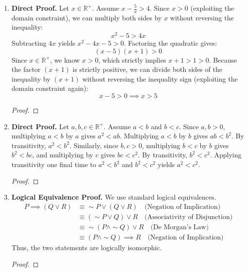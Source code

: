 \documentclass[11pt]{article}
\renewcommand{\qedsymbol}{$\blacksquare$}
\begin{document}
\begin{enumerate}
    \item \textbf{Direct Proof.} Let $x \in \mathbb{R}^+$. Assume $x - \frac{5}{x} > 4$. Since $x > 0$ (exploiting the domain constraint), we can multiply both sides by $x$ without reversing the inequality:
    \[ x^2 - 5 > 4x \]
    Subtracting $4x$ yields $x^2 - 4x - 5 > 0$. Factoring the quadratic gives:
    \[ (x - 5)(x + 1) > 0 \]
    Since $x \in \mathbb{R}^+$, we know $x > 0$, which strictly implies $x + 1 > 1 > 0$. Because the factor $(x + 1)$ is strictly positive, we can divide both sides of the inequality by $(x + 1)$ without reversing the inequality sign (exploiting the domain constraint again):
    \[ x - 5 > 0 \implies x > 5 \]
    \begin{proof}\renewcommand{\qedsymbol}{$\blacksquare$}\end{proof}

    \item \textbf{Direct Proof.} Let $a, b, c \in \mathbb{R}^+$. Assume $a < b$ and $b < c$. Since $a, b > 0$, multiplying $a < b$ by $a$ gives $a^2 < ab$. Multiplying $a < b$ by $b$ gives $ab < b^2$. By transitivity, $a^2 < b^2$. Similarly, since $b, c > 0$, multiplying $b < c$ by $b$ gives $b^2 < bc$, and multiplying by $c$ gives $bc < c^2$. By transitivity, $b^2 < c^2$. Applying transitivity one final time to $a^2 < b^2$ and $b^2 < c^2$ yields $a^2 < c^2$.
    \begin{proof}\renewcommand{\qedsymbol}{$\blacksquare$}\end{proof}

    \item \textbf{Logical Equivalence Proof.} We use standard logical equivalences.
    \begin{align*}
        P \implies (Q \lor R) &\equiv \sim P \lor (Q \lor R) \quad \text{(Negation of Implication)} \\
                              &\equiv (\sim P \lor Q) \lor R \quad \text{(Associativity of Disjunction)} \\
                              &\equiv \sim(P \land \sim Q) \lor R \quad \text{(De Morgan's Law)} \\
                              &\equiv (P \land \sim Q) \implies R \quad \text{(Negation of Implication)}
    \end{align*}
    Thus, the two statements are logically isomorphic.
    \begin{proof}\renewcommand{\qedsymbol}{$\blacksquare$}\end{proof}


\end{enumerate}
\end{document}
